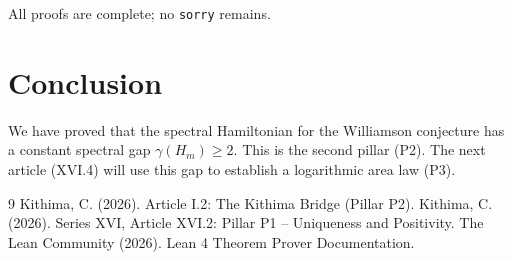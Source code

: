 \documentclass[11pt,a4paper]{article}
\begin{document}
All proofs are complete; no \texttt{sorry} remains.

\section{Conclusion}

We have proved that the spectral Hamiltonian for the Williamson conjecture has a constant spectral gap $\gamma(H_m) \ge 2$. This is the second pillar (P2). The next article (XVI.4) will use this gap to establish a logarithmic area law (P3).


\begin{thebibliography}{9}
  Kithima, C. (2026). Article I.2: The Kithima Bridge (Pillar P2).
  Kithima, C. (2026). Series XVI, Article XVI.2: Pillar P1 – Uniqueness and Positivity.
  The Lean Community (2026). Lean 4 Theorem Prover Documentation.
\end{thebibliography}
\end{document}

